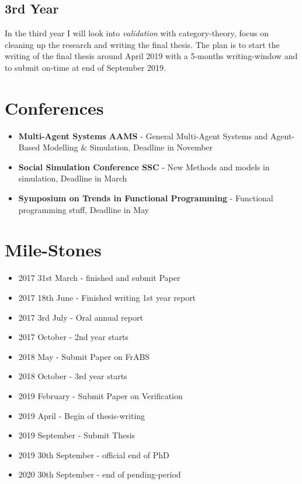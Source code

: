 \subsection{3rd Year}
In the third year I will look into \textit{validation} with category-theory, focus on cleaning up the research and writing the final thesis. The plan is to start the writing of the final thesis around April 2019 with a 5-months writing-window and to submit on-time at end of September 2019.

\section{Conferences}
\begin{itemize}
	\item \textbf{Multi-Agent Systems AAMS} - General Multi-Agent Systems and Agent-Based Modelling \& Simulation, Deadline in November
	\item \textbf{Social Simulation Conference SSC} - New Methods and models in simulation, Deadline in March
	\item \textbf{Symposium on Trends in Functional Programming} - Functional programming stuff, Deadline in May
\end{itemize}

\section{Mile-Stones}
\begin{itemize}
	\item 2017 31st March - finished and submit Paper 
	\item 2017 18th June - Finished writing 1st year report 
	\item 2017 3rd July - Oral annual report
	\item 2017 October - 2nd year starts
	\item 2018 May - Submit Paper on FrABS
	\item 2018 October - 3rd year starts
	\item 2019 February - Submit Paper on Verification
	\item 2019 April - Begin of thesis-writing
	\item 2019 September - Submit Thesis
	\item 2019 30th September - official end of PhD
	\item 2020 30th September - end of pending-period
\end{itemize}


